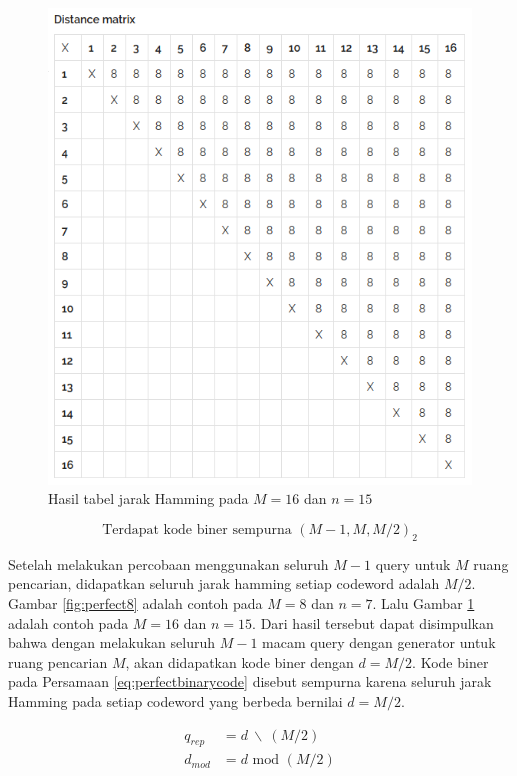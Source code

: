 \begin{figure}
\centering
\includegraphics[scale=0.45]{../img/perfect16.png}
\caption{Hasil tabel jarak Hamming pada $M=16$ dan $n=15$}
\label{fig:perfect16}
\end{figure}

\begin{equation}
\label{eq:perfectbinarycode}
\text{Terdapat kode biner sempurna }(M-1, M, M/2)_2
\end{equation}

Setelah melakukan percobaan menggunakan seluruh $M-1$ query untuk $M$ ruang pencarian, didapatkan seluruh jarak hamming setiap codeword adalah $M/2$. Gambar \ref{fig:perfect8} adalah contoh pada $M=8$ dan $n=7$. Lalu Gambar \ref{fig:perfect16} adalah contoh pada $M=16$ dan $n=15$. Dari hasil tersebut dapat disimpulkan bahwa dengan melakukan seluruh $M-1$ macam query dengan generator untuk ruang pencarian $M$, akan didapatkan kode biner dengan $d=M/2$. Kode biner pada Persamaan \ref{eq:perfectbinarycode} disebut sempurna karena seluruh jarak Hamming pada setiap codeword yang berbeda bernilai $d = M/2$.

\begin{align}
q_{rep} &= d\ \backslash\ (M/2) \label{eq:qrep} \\
d_{mod} &= d \text{ mod } (M/2) \label{eq:dmod}
\end{align}


